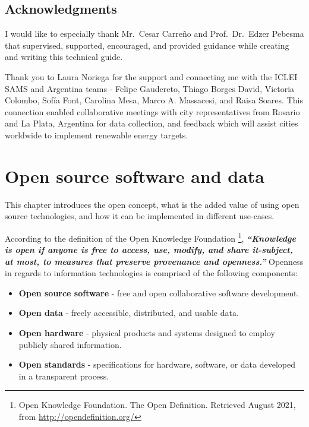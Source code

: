 \documentclass[
]{book}
\providecommand{\tightlist}{%
  \setlength{\itemsep}{0pt}\setlength{\parskip}{0pt}}
\begin{document}
\hypertarget{acknowledgments}{%
\section*{Acknowledgments}\label{acknowledgments}}

I would like to especially thank Mr.~Cesar Carreño and Prof.~Dr.~Edzer Pebesma that supervised, supported, encouraged, and provided guidance while creating and writing this technical guide.

Thank you to Laura Noriega for the support and connecting me with the ICLEI SAMS and Argentina teams - Felipe Gaudereto, Thiago Borges David, Victoria Colombo, Sofía Font, Carolina Mesa, Marco A. Massacesi, and Raisa Soares. This connection enabled collaborative meetings with city representatives from Rosario and La Plata, Argentina for data collection, and feedback which will assist cities worldwide to implement renewable energy targets.

\hypertarget{open-source-software-and-data}{%
\chapter{Open source software and data}\label{open-source-software-and-data}}

This chapter introduces the open concept, what is the added value of using open source technologies, and how it can be implemented in different use-cases.

According to the definition of the Open Knowledge Foundation \footnote{Open Knowledge Foundation. The Open Definition. Retrieved August 2021, from \url{http://opendefinition.org/}}, \emph{\textbf{``Knowledge is open if anyone is free to access, use, modify, and share it-subject, at most, to measures that preserve provenance and openness.''}}
Openness in regards to information technologies is comprised of the following components:

\begin{itemize}
\tightlist
\item
  \textbf{Open source software} - free and open collaborative software development.
\item
  \textbf{Open data} - freely accessible, distributed, and usable data.
\item
  \textbf{Open hardware} - physical products and systems designed to employ publicly shared information.
\item
  \textbf{Open standards} - specifications for hardware, software, or data developed in a transparent process.
\end{itemize}
\end{document}
